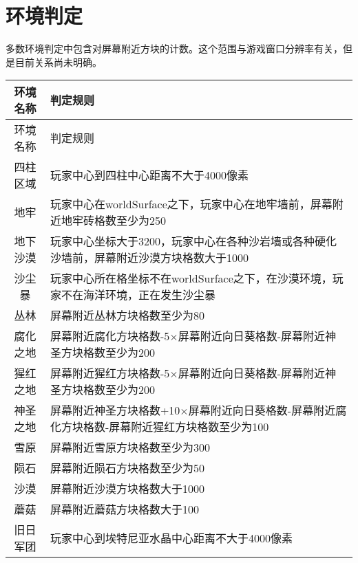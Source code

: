 \chapter{环境判定}
多数环境判定中包含对屏幕附近方块的计数。这个范围与游戏窗口分辨率有关，但是目前关系尚未明确。
\begin{longtable}{c|p{}}
\hline 环境名称&判定规则\\\hline
\endfirsthead
\hline 环境名称&判定规则\\\hline
\endhead
\hline
\endfoot
四柱区域&玩家中心到四柱中心距离不大于4000像素\\\hline
地牢&玩家中心在worldSurface之下，玩家中心在地牢墙前，屏幕附近地牢砖格数至少为250\\\hline
地下沙漠&玩家中心坐标大于3200，玩家中心在各种沙岩墙或各种硬化沙墙前，屏幕附近沙漠方块格数大于1000\\\hline
沙尘暴&玩家中心所在格坐标不在worldSurface之下，在沙漠环境，玩家不在海洋环境，正在发生沙尘暴\\\hline
丛林&屏幕附近丛林方块格数至少为80\\\hline
腐化之地&屏幕附近腐化方块格数-5$\times$屏幕附近向日葵格数-屏幕附近神圣方块格数至少为200\\\hline
猩红之地&屏幕附近猩红方块格数-5$\times$屏幕附近向日葵格数-屏幕附近神圣方块格数至少为200\\\hline
神圣之地&屏幕附近神圣方块格数+10$\times$屏幕附近向日葵格数-屏幕附近腐化方块格数-屏幕附近猩红方块格数至少为100\\\hline
雪原&屏幕附近雪原方块格数至少为300\\\hline
陨石&屏幕附近陨石方块格数至少为50\\\hline
沙漠&屏幕附近沙漠方块格数大于1000\\\hline
蘑菇&屏幕附近蘑菇方块格数大于100\\\hline
旧日军团&玩家中心到埃特尼亚水晶中心距离不大于4000像素
\end{longtable}